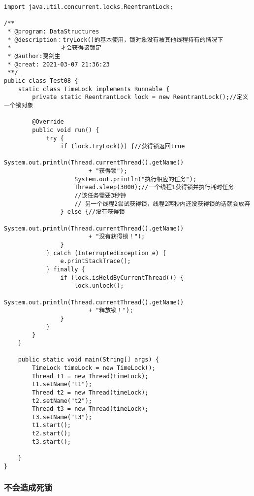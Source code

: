 \documentclass[a4paper]{report}
\begin{document}
\begin{Verbatim}[frame=single,numbersep=5pt,xleftmargin=1.5em,xrightmargin=1.5em]
import java.util.concurrent.locks.ReentrantLock;

/**
 * @program: DataStructures
 * @description：tryLock()的基本使用，锁对象没有被其他线程持有的情况下
 *              才会获得该锁定
 * @author:戛剑生
 * @creat: 2021-03-07 21:36:23
 **/
public class Test08 {
    static class TimeLock implements Runnable {
        private static ReentrantLock lock = new ReentrantLock();//定义一个锁对象

        @Override
        public void run() {
            try {
                if (lock.tryLock()) {//获得锁返回true
                    System.out.println(Thread.currentThread().getName()
                        + "获得锁");
                    System.out.println("执行相应的任务");
                    Thread.sleep(3000);//一个线程1获得锁并执行耗时任务
                    //该任务需要3秒钟
                    // 另一个线程2尝试获得锁，线程2两秒内还没获得锁的话就会放弃
                } else {//没有获得锁
                    System.out.println(Thread.currentThread().getName()
                        + "没有获得锁！");
                }
            } catch (InterruptedException e) {
                e.printStackTrace();
            } finally {
                if (lock.isHeldByCurrentThread()) {
                    lock.unlock();
                    System.out.println(Thread.currentThread().getName()
                        + "释放锁！");
                }
            }
        }
    }

    public static void main(String[] args) {
        TimeLock timeLock = new TimeLock();
        Thread t1 = new Thread(timeLock);
        t1.setName("t1");
        Thread t2 = new Thread(timeLock);
        t2.setName("t2");
        Thread t3 = new Thread(timeLock);
        t3.setName("t3");
        t1.start();
        t2.start();
        t3.start();

    }
}\end{Verbatim}

\subsubsection{不会造成死锁}
\end{document}
